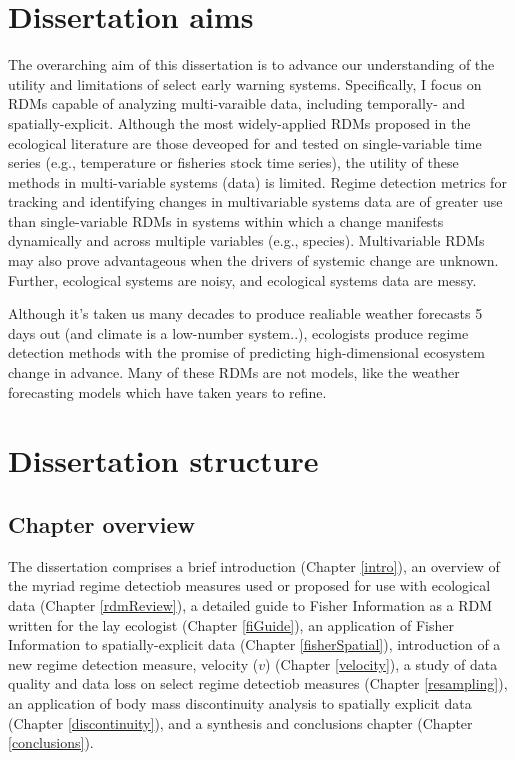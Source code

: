 \documentclass[12pt,twoside,openany]{reedthesis}
\begin{document}
\section{Dissertation aims}\label{dissertation-aims}

The overarching aim of this dissertation is to advance our understanding
of the utility and limitations of select early warning systems.
Specifically, I focus on RDMs capable of analyzing multi-varaible data,
including temporally- and spatially-explicit. Although the most
widely-applied RDMs proposed in the ecological literature are those
deveoped for and tested on single-variable time series (e.g.,
temperature or fisheries stock time series), the utility of these
methods in multi-variable systems (data) is limited. Regime detection
metrics for tracking and identifying changes in multivariable systems
data are of greater use than single-variable RDMs in systems within
which a change manifests dynamically and across multiple variables
(e.g., species). Multivariable RDMs may also prove advantageous when the
drivers of systemic change are unknown. Further, ecological systems are
noisy, and ecological systems data are messy.

Although it's taken us many decades to produce realiable weather
forecasts 5 days out (and climate is a low-number system..), ecologists
produce regime detection methods with the promise of predicting
high-dimensional ecosystem change in advance. Many of these RDMs are not
models, like the weather forecasting models which have taken years to
refine.

\section{Dissertation structure}\label{dissertation-structure}

\subsection{Chapter overview}\label{chapter-overview}

The dissertation comprises a brief introduction (Chapter \ref{intro}),
an overview of the myriad regime detectiob measures used or proposed for
use with ecological data (Chapter \ref{rdmReview}), a detailed guide to
Fisher Information as a RDM written for the lay ecologist (Chapter
\ref{fiGuide}), an application of Fisher Information to
spatially-explicit data (Chapter \ref{fisherSpatial}), introduction of a
new regime detection measure, velocity (\(v\)) (Chapter \ref{velocity}),
a study of data quality and data loss on select regime detectiob
measures (Chapter \ref{resampling}), an application of body mass
discontinuity analysis to spatially explicit data (Chapter
\ref{discontinuity}), and a synthesis and conclusions chapter (Chapter
\ref{conclusions}).
\end{document}
